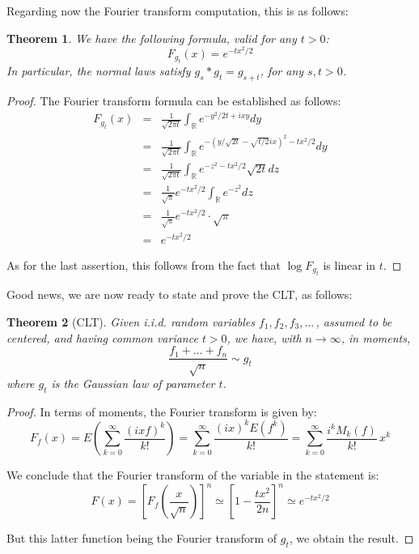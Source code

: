 \documentclass[12pt]{amsbook}
\newtheorem{theorem}{Theorem}[chapter]
\begin{document}
Regarding now the Fourier transform computation, this is as follows:

\begin{theorem}
We have the following formula, valid for any $t>0$:
$$F_{g_t}(x)=e^{-tx^2/2}$$
In particular, the normal laws satisfy $g_s*g_t=g_{s+t}$, for any $s,t>0$.
\end{theorem}

\begin{proof}
The Fourier transform formula can be established as follows:
\begin{eqnarray*}
F_{g_t}(x)
&=&\frac{1}{\sqrt{2\pi t}}\int_\mathbb Re^{-y^2/2t+ixy}dy\\
&=&\frac{1}{\sqrt{2\pi t}}\int_\mathbb Re^{-(y/\sqrt{2t}-\sqrt{t/2}ix)^2-tx^2/2}dy\\
&=&\frac{1}{\sqrt{2\pi t}}\int_\mathbb Re^{-z^2-tx^2/2}\sqrt{2t}dz\\
&=&\frac{1}{\sqrt{\pi}}e^{-tx^2/2}\int_\mathbb Re^{-z^2}dz\\
&=&\frac{1}{\sqrt{\pi}}e^{-tx^2/2}\cdot\sqrt{\pi}\\
&=&e^{-tx^2/2}
\end{eqnarray*}

As for the last assertion, this follows from the fact that $\log F_{g_t}$ is linear in $t$.
\end{proof}

Good news, we are now ready to state and prove the CLT, as follows:

\begin{theorem}[CLT]
Given i.i.d. random variables $f_1,f_2,f_3,\ldots\,$, assumed to be centered, and having common variance $t>0$, we have, with $n\to\infty$, in moments,
$$\frac{f_1+\ldots+f_n}{\sqrt{n}}\sim g_t$$
where $g_t$ is the Gaussian law of parameter $t$.
\end{theorem}

\begin{proof}
In terms of moments, the Fourier transform is given by:
$$F_f(x)
=E\left(\sum_{k=0}^\infty\frac{(ixf)^k}{k!}\right)
=\sum_{k=0}^\infty\frac{(ix)^kE(f^k)}{k!}
=\sum_{k=0}^\infty\frac{i^kM_k(f)}{k!}\,x^k$$

We conclude that the Fourier transform of the variable in the statement is:
$$F(x)
=\left[F_f\left(\frac{x}{\sqrt{n}}\right)\right]^n
\simeq\left[1-\frac{tx^2}{2n}\right]^n
\simeq e^{-tx^2/2}$$

But this latter function being the Fourier transform of $g_t$, we obtain the result.
\end{proof}
\end{document}
